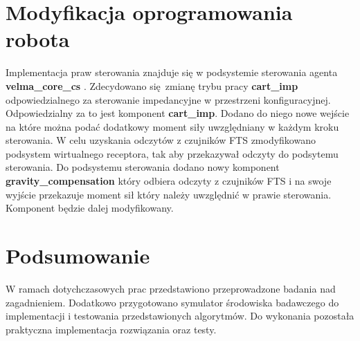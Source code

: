 \documentclass[12pt,a4paper]{article}
\begin{document}
	
	\section{Modyfikacja oprogramowania robota}
	Implementacja praw sterowania znajduje się w podsystemie sterowania agenta \textbf{velma\_core\_cs} \cite{velma}. Zdecydowano się zmianę trybu pracy \textbf{cart\_imp} odpowiedzialnego za sterowanie impedancyjne w przestrzeni konfiguracyjnej. Odpowiedzialny za to jest komponent \textbf{cart\_imp}. Dodano do niego nowe wejście na które można podać dodatkowy moment siły uwzględniany w każdym kroku sterowania. W celu uzyskania odczytów z czujników FTS zmodyfikowano podsystem wirtualnego receptora, tak aby przekazywał odczyty do podsytemu sterowania. Do podsystemu sterowania dodano nowy komponent \textbf{gravity\_compensation} który odbiera odczyty z czujników FTS i na swoje wyjście przekazuje moment sił który należy uwzględnić w prawie sterowania. Komponent będzie dalej modyfikowany.
	
	
	

	\section{Podsumowanie}
	W ramach dotychczasowych prac przedstawiono przeprowadzone badania nad zagadnieniem. Dodatkowo przygotowano symulator środowiska badawczego do implementacji i testowania przedstawionych algorytmów. Do wykonania pozostała praktyczna implementacja rozwiązania oraz testy.
	
	
	
	
\end{document}
